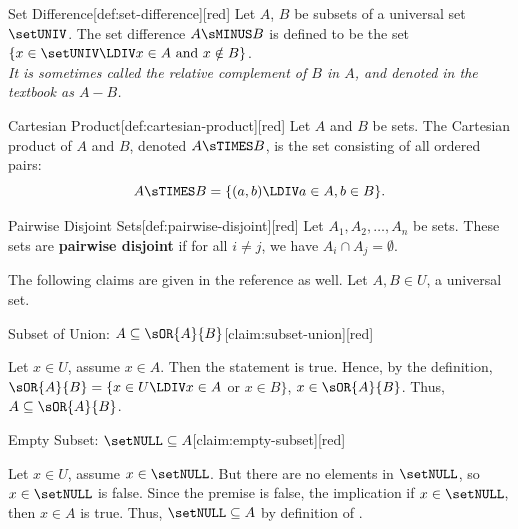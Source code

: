\begin{define}{Set Difference}[def:set-difference][red]
  Let $A$, $B$ be subsets of a universal set $\setUNIV$. The set difference $A \sMINUS B$ is defined to be the set $\{ x \in \setUNIV \LDIV x \in A \text{ and } x \notin B\}$. \vspace*{10px}\\
  \textit{It is sometimes called the relative complement of $B$ in $A$, and denoted in the textbook as $A - B$.}
\end{define}

\begin{define}{Cartesian Product}[def:cartesian-product][red]
  Let $A$ and $B$ be sets. The Cartesian product of $A$ and $B$, denoted $A \sTIMES B$, is the set consisting of all ordered pairs:
  \[
  A \sTIMES B = \{(a, b) \LDIV a \in A, b \in B\}.
  \]
\end{define}

\begin{define}{Pairwise Disjoint Sets}[def:pairwise-disjoint][red]
  Let $A_1, A_2, \ldots, A_n$ be sets. These sets are \textbf{pairwise disjoint} if for all $i \neq j$, we have $A_i \cap A_j = \emptyset$.
\end{define}


\newpage

The following claims are given in the reference as well. Let $A,B\in U$, a universal set.


\begin{define}{Subset of Union: $A \subseteq \sOR{A}{B}$}[claim:subset-union][red]
  \begin{subprove}[red]
      Let $x\in U$, assume $x\in A$. Then the statement  is true.
      Hence, by the definition, $\sOR{A}{B}=\{x\in U\LDIV x\in A$ or $x\in B\}$, $x\in \sOR{A}{B}$.
      Thus, $A \subseteq \sOR{A}{B}$.
  \end{subprove}
\end{define}

\begin{define}{Empty Subset: $\setNULL \subseteq A$}[claim:empty-subset][red]
  \begin{subprove}[red]
      Let $x\in U$, assume $x\in \setNULL$. But there are no elements in $\setNULL$, so
      $x\in \setNULL$ is false. Since the premise is false, the implication if $x\in \setNULL$,
      then $x\in A$ is true. Thus, $\setNULL \subseteq A$ by definition of .
  \end{subprove}
\end{define}

